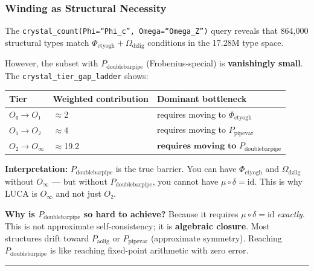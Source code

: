 \documentclass[12pt,a4paper]{article}
\begin{document}
\subsubsection{Winding as Structural Necessity}

The \texttt{crystal\_count(Phi=\textquotedblleft Phi\_c\textquotedblright, Omega=\textquotedblleft Omega\_Z\textquotedblright)} query reveals that 864,000 structural types match $\Phi_{\text{ctyogh}} + \Omega_{\text{dzlig}}$ conditions in the 17.28M type space.

However, the subset with \textbf{$P_{\text{doublebarpipe}}$} (Frobenius-special) is \textbf{vanishingly small}. The \texttt{crystal\_tier\_gap\_ladder} shows:

\begin{table}[htbp]
\centering
\small
\begin{tabularx}{\textwidth}{>{\centering\arraybackslash}X >{\centering\arraybackslash}X >{\centering\arraybackslash}X}
\toprule
\rowcolor{gray!25}\textbf{Tier} & \textbf{Weighted contribution} & \textbf{Dominant bottleneck} \\
\midrule
$O₀ \to O₁$ & $\approx$2 & requires moving to $\Phi_{\text{ctyogh}}$ \\
$O₁ \to O₂$ & $\approx$4 & requires moving to $P_{\text{pipevar}}$ \\
$O₂ \to O_{\infty}$ & $\mathbf{\approx}$19.2 & $\mathbf{\text{requires moving to}}$ $P_{\text{doublebarpipe}}$ \\
\bottomrule
\end{tabularx}
\end{table}

\textbf{Interpretation:} $P_{\text{doublebarpipe}}$ is the true barrier. You can have $\Phi_{\text{ctyogh}}$ and $\Omega_{\text{dzlig}}$ without $O_{\infty}$ --- but without $P_{\text{doublebarpipe}}$, you cannot have $\mu \circ \delta = \text{id}$. This is why LUCA is $O_{\infty}$ and not just $O₂$.

\textbf{Why is $P_{\text{doublebarpipe}}$ so hard to achieve?} Because it requires $\mu \circ \delta = \text{id}$ \emph{exactly}. This is not approximate self-consistency; it is \textbf{algebraic closure}. Most structures drift toward $P_{\text{aolig}}$ or $P_{\text{pipevar}}$ (approximate symmetry). Reaching $P_{\text{doublebarpipe}}$ is like reaching fixed-point arithmetic with zero error.

\begin{center}
\rule{0.5\textwidth}{0.4pt}
\end{center}
\end{document}
